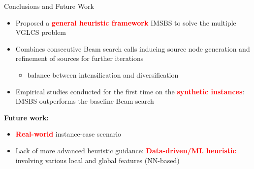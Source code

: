 \documentclass{beamer}
\begin{document}
\begin{frame}{Conclusions and Future Work}
	
	\begin{itemize}
		\item Proposed a \textcolor{red}{\textbf{general heuristic framework}} IMSBS to solve the multiple VGLCS problem  
		\item Combines consecutive Beam search calls inducing source node generation and  refinement of sources for further  iterations
		\begin{itemize}
			\item  balance between intensification and diversification 
	    \end{itemize}
		\item Empirical studies conducted for the first time on the \textcolor{red}{\textbf{synthetic instances}}: IMSBS outperforms the baseline Beam search  
	\end{itemize}    \vspace{0.3cm}
	
\textbf{Future work:}
	\begin{itemize}
		\item \textcolor{red}{\textbf{Real-world}} instance-case scenario
		\item Lack of more advanced heuristic guidance: \textcolor{red}{\textbf{Data-driven/ML heuristic}} involving various local and global features (NN-based)
	\end{itemize}
\end{frame}

\begin{frame}
	
	
 
\end{frame}
\end{document}
